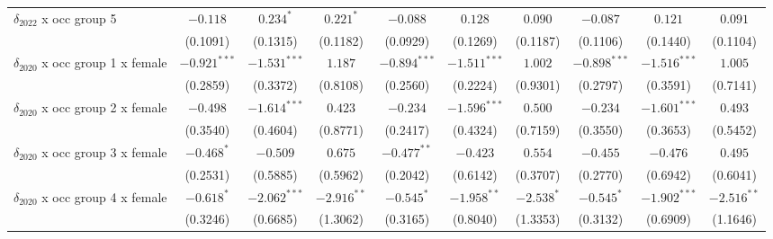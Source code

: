 \begin{tabular}{l|ccc|ccc|ccc|}
$\delta_{2022}$ x occ group 5          &                $-0.118$ &       $0.234^*$ &       $0.221^*$ &                 $-0.088$ &         $0.128$ &         $0.090$ &                 $-0.087$ &         $0.121$ &         $0.091$ \\
                                       &                (0.1091) &        (0.1315) &        (0.1182) &                 (0.0929) &        (0.1269) &        (0.1187) &                 (0.1106) &        (0.1440) &        (0.1104) \\
$\delta_{2020}$ x occ group 1 x female &          $-0.921^{***}$ &  $-1.531^{***}$ &         $1.187$ &           $-0.894^{***}$ &  $-1.511^{***}$ &         $1.002$ &           $-0.898^{***}$ &  $-1.516^{***}$ &         $1.005$ \\
                                       &                (0.2859) &        (0.3372) &        (0.8108) &                 (0.2560) &        (0.2224) &        (0.9301) &                 (0.2797) &        (0.3591) &        (0.7141) \\
$\delta_{2020}$ x occ group 2 x female &                $-0.498$ &  $-1.614^{***}$ &         $0.423$ &                 $-0.234$ &  $-1.596^{***}$ &         $0.500$ &                 $-0.234$ &  $-1.601^{***}$ &         $0.493$ \\
                                       &                (0.3540) &        (0.4604) &        (0.8771) &                 (0.2417) &        (0.4324) &        (0.7159) &                 (0.3550) &        (0.3653) &        (0.5452) \\
$\delta_{2020}$ x occ group 3 x female &              $-0.468^*$ &        $-0.509$ &         $0.675$ &            $-0.477^{**}$ &        $-0.423$ &         $0.554$ &                 $-0.455$ &        $-0.476$ &         $0.495$ \\
                                       &                (0.2531) &        (0.5885) &        (0.5962) &                 (0.2042) &        (0.6142) &        (0.3707) &                 (0.2770) &        (0.6942) &        (0.6041) \\
$\delta_{2020}$ x occ group 4 x female &              $-0.618^*$ &  $-2.062^{***}$ &   $-2.916^{**}$ &               $-0.545^*$ &   $-1.958^{**}$ &      $-2.538^*$ &               $-0.545^*$ &  $-1.902^{***}$ &   $-2.516^{**}$ \\
                                       &                (0.3246) &        (0.6685) &        (1.3062) &                 (0.3165) &        (0.8040) &        (1.3353) &                 (0.3132) &        (0.6909) &        (1.1646) \\

\end{tabular}
